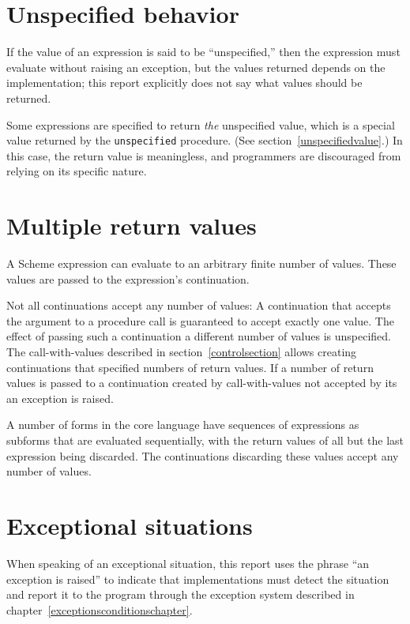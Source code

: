 \section{Unspecified behavior}

\vest If the value of an expression is said to be ``unspecified,''
then the expression must evaluate without raising an exception, but
the values returned depends on the implementation; this report
explicitly does not say what values should be returned.

Some expressions are specified to return \emph{the} unspecified value,
which is a special value returned by the \texttt{unspecified}
procedure.  (See section~\ref{unspecifiedvalue}.)  In this case, the
return value is meaningless, and programmers are discouraged from
relying on its specific nature.

\section{Multiple return values}

A Scheme expression can evaluate to an arbitrary finite number of
values.  These values are passed to the expression's continuation.

Not all continuations accept any number of values: A continuation that
accepts the argument to a procedure call is guaranteed to accept
exactly one value.  The effect of passing such a continuation a
different number of values is unspecified.  The {\cf call-with-values}
described in section~\ref{controlsection} allows creating
continuations that specified numbers of return values.  If a number of
return values is passed to a continuation created by {\cf
  call-with-values} not accepted by its  an exception is
raised.

A number of forms in the core language have sequences of expressions
as subforms that are evaluated sequentially, with the return values of
all but the last expression being discarded.  The continuations
discarding these values accept any number of values.

\section{Exceptional situations}

 When speaking of an exceptional situation, this
report uses the phrase ``an exception is raised'' to indicate
that implementations must detect the situation and report it to the
program through the exception system described in
chapter~\ref{exceptionsconditionschapter}.

